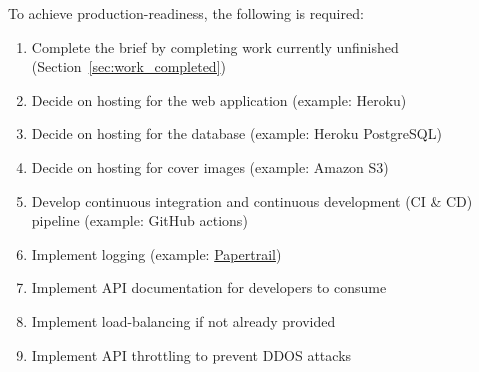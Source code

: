 \documentclass[a4paper]{article}
\begin{document}
To achieve production-readiness, the following is required:

\begin{enumerate}
  \item Complete the brief by completing work currently unfinished (Section~\ref{sec:work_completed})
  \item Decide on hosting for the web application (example: Heroku)
  \item Decide on hosting for the database (example: Heroku PostgreSQL)
  \item Decide on hosting for cover images (example: Amazon S3)
  \item Develop continuous integration and continuous development (CI \& CD) pipeline (example: GitHub actions)
  \item Implement logging (example: \href{https://www.papertrail.com/}{Papertrail})
  \item Implement API documentation for developers to consume
  \item Implement load-balancing if not already provided
  \item Implement API throttling to prevent DDOS attacks
\end{enumerate}
\end{document}
